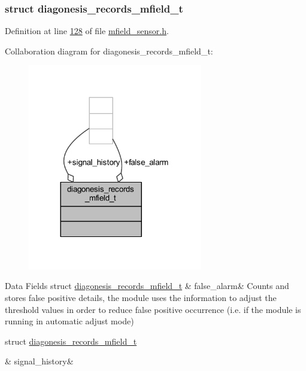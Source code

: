 \subsubsection{struct diagonesis\+\_\+records\+\_\+mfield\+\_\+t}


Definition at line \hyperlink{a00019_source_l00128}{128} of file \hyperlink{a00019_source}{mfield\+\_\+sensor.\+h}.



Collaboration diagram for diagonesis\+\_\+records\+\_\+mfield\+\_\+t\+:\nopagebreak
\begin{figure}[H]
\begin{center}
\leavevmode
\includegraphics[width=216pt]{d3/dca/a00954}
\end{center}
\end{figure}
\begin{DoxyFields}{Data Fields}
\hypertarget{a00019_a55109284fe950025b5d9f3dde60d4553}{struct \hyperlink{a00019_dc/dc9/a00389}{diagonesis\+\_\+records\+\_\+mfield\+\_\+t}}\label{a00019_a55109284fe950025b5d9f3dde60d4553}
&
false\+\_\+alarm&
Counts and stores false positive details, the module uses the information to adjust the threshold values in order to reduce false positive occurrence (i.\+e. if the module is running in automatic adjust mode) \\
\hline

\hypertarget{a00019_ab7038f4de1f77b52a7f89e9f77c0b846}{struct \hyperlink{a00019_d4/d27/a00392}{diagonesis\+\_\+records\+\_\+mfield\+\_\+t}}\label{a00019_ab7038f4de1f77b52a7f89e9f77c0b846}
&
signal\+\_\+history&
\\
\hline

\end{DoxyFields}
\label{dd/dd5/a00861}
\hypertarget{a00019_dd/dd5/a00861}{}
